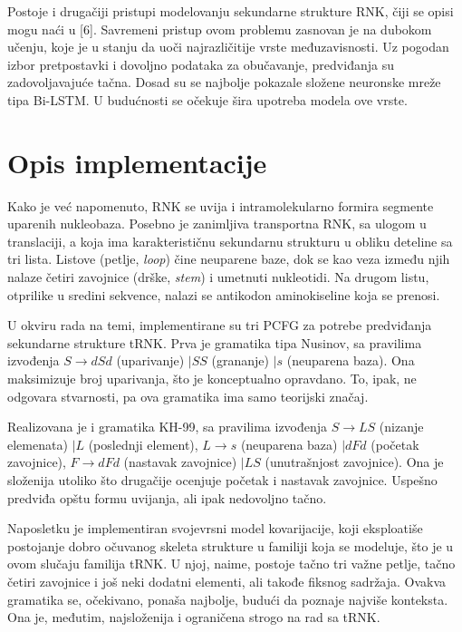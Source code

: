\documentclass[a4paper, 12pt]{article}
\begin{document}
Postoje i drugačiji pristupi modelovanju sekundarne strukture RNK, čiji se opisi mogu naći u [6]. Savremeni pristup ovom problemu zasnovan je na dubokom učenju, koje je u stanju da uoči najrazličitije vrste međuzavisnosti. Uz pogodan izbor pretpostavki i dovoljno podataka za obučavanje, predviđanja su zadovoljavajuće tačna. Dosad su se najbolje pokazale složene neuronske mreže tipa Bi-LSTM. U budućnosti se očekuje šira upotreba modela ove vrste.


\section{Opis implementacije}

Kako je već napomenuto, RNK se uvija i intramolekularno formira segmente uparenih nukleobaza. Posebno je zanimljiva transportna RNK, sa ulogom u translaciji, a koja ima karakterističnu sekundarnu strukturu u obliku deteline sa tri lista. Listove (petlje, \textit{loop}) čine neuparene baze, dok se kao veza između njih nalaze četiri zavojnice (drške, \textit{stem}) i umetnuti nukleotidi. Na drugom listu, otprilike u sredini sekvence, nalazi se antikodon aminokiseline koja se prenosi.

U okviru rada na temi, implementirane su tri PCFG za potrebe predviđanja sekundarne strukture tRNK. Prva je gramatika tipa Nusinov, sa pravilima izvođenja $S \rightarrow dSd$ (uparivanje) $| SS$ (grananje) $| s$ (neuparena baza). Ona maksimizuje broj uparivanja, što je konceptualno opravdano. To, ipak, ne odgovara stvarnosti, pa ova gramatika ima samo teorijski značaj.

Realizovana je i gramatika KH-99, sa pravilima izvođenja $S \rightarrow LS$ (nizanje elemenata) $| L$ (poslednji element), $L \rightarrow s$ (neuparena baza) $| dFd$ (početak zavojnice), $F \rightarrow dFd$ (nastavak zavojnice) $| LS$ (unutrašnjost zavojnice). Ona je složenija utoliko što drugačije ocenjuje početak i nastavak zavojnice. Uspešno predviđa opštu formu uvijanja, ali ipak nedovoljno tačno.

Naposletku je implementiran svojevrsni model kovarijacije, koji eksploatiše postojanje dobro očuvanog skeleta strukture u familiji koja se modeluje, što je u ovom slučaju familija tRNK. U njoj, naime, postoje tačno tri važne petlje, tačno četiri zavojnice i još neki dodatni elementi, ali takođe fiksnog sadržaja. Ovakva gramatika se, očekivano, ponaša najbolje, budući da poznaje najviše konteksta. Ona je, međutim, najsloženija i ograničena strogo na rad sa tRNK.
\end{document}
